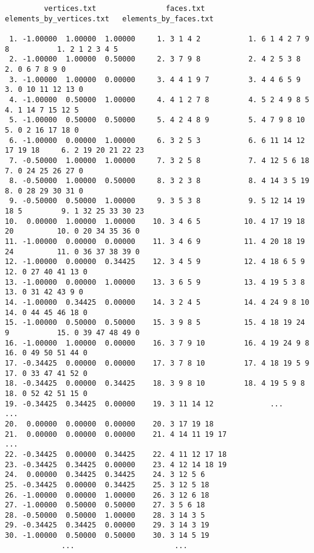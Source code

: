 {\tiny
\begin{verbatim}
         vertices.txt                faces.txt       elements_by_vertices.txt   elements_by_faces.txt

 1. -1.00000  1.00000  1.00000     1. 3 1 4 2           1. 6 1 4 2 7 9 8           1. 2 1 2 3 4 5
 2. -1.00000  1.00000  0.50000     2. 3 7 9 8           2. 4 2 5 3 8               2. 0 6 7 8 9 0
 3. -1.00000  1.00000  0.00000     3. 4 4 1 9 7         3. 4 4 6 5 9               3. 0 10 11 12 13 0
 4. -1.00000  0.50000  1.00000     4. 4 1 2 7 8         4. 5 2 4 9 8 5             4. 1 14 7 15 12 5
 5. -1.00000  0.50000  0.50000     5. 4 2 4 8 9         5. 4 7 9 8 10              5. 0 2 16 17 18 0
 6. -1.00000  0.00000  1.00000     6. 3 2 5 3           6. 6 11 14 12 17 19 18     6. 2 19 20 21 22 23
 7. -0.50000  1.00000  1.00000     7. 3 2 5 8           7. 4 12 5 6 18             7. 0 24 25 26 27 0
 8. -0.50000  1.00000  0.50000     8. 3 2 3 8           8. 4 14 3 5 19             8. 0 28 29 30 31 0
 9. -0.50000  0.50000  1.00000     9. 3 5 3 8           9. 5 12 14 19 18 5         9. 1 32 25 33 30 23
10.  0.00000  1.00000  1.00000    10. 3 4 6 5          10. 4 17 19 18 20          10. 0 20 34 35 36 0
11. -1.00000  0.00000  0.00000    11. 3 4 6 9          11. 4 20 18 19 24          11. 0 36 37 38 39 0
12. -1.00000  0.00000  0.34425    12. 3 4 5 9          12. 4 18 6 5 9             12. 0 27 40 41 13 0
13. -1.00000  0.00000  1.00000    13. 3 6 5 9          13. 4 19 5 3 8             13. 0 31 42 43 9 0
14. -1.00000  0.34425  0.00000    14. 3 2 4 5          14. 4 24 9 8 10            14. 0 44 45 46 18 0
15. -1.00000  0.50000  0.50000    15. 3 9 8 5          15. 4 18 19 24 9           15. 0 39 47 48 49 0
16. -1.00000  1.00000  0.00000    16. 3 7 9 10         16. 4 19 24 9 8            16. 0 49 50 51 44 0
17. -0.34425  0.00000  0.00000    17. 3 7 8 10         17. 4 18 19 5 9            17. 0 33 47 41 52 0
18. -0.34425  0.00000  0.34425    18. 3 9 8 10         18. 4 19 5 9 8             18. 0 52 42 51 15 0
19. -0.34425  0.34425  0.00000    19. 3 11 14 12             ...                           ...        
20.  0.00000  0.00000  0.00000    20. 3 17 19 18  
21.  0.00000  0.00000  0.00000    21. 4 14 11 19 17                                                                             ...
22. -0.34425  0.00000  0.34425    22. 4 11 12 17 18      
23. -0.34425  0.34425  0.00000    23. 4 12 14 18 19           
24.  0.00000  0.34425  0.34425    24. 3 12 5 6                   
25. -0.34425  0.00000  0.34425    25. 3 12 5 18                   
26. -1.00000  0.00000  1.00000    26. 3 12 6 18                   
27. -1.00000  0.50000  0.50000    27. 3 5 6 18                   
28. -0.50000  0.50000  1.00000    28. 3 14 3 5                   
29. -0.34425  0.34425  0.00000    29. 3 14 3 19                   
30. -1.00000  0.50000  0.50000    30. 3 14 5 19                   
             ...                       ...

\end{verbatim}}

